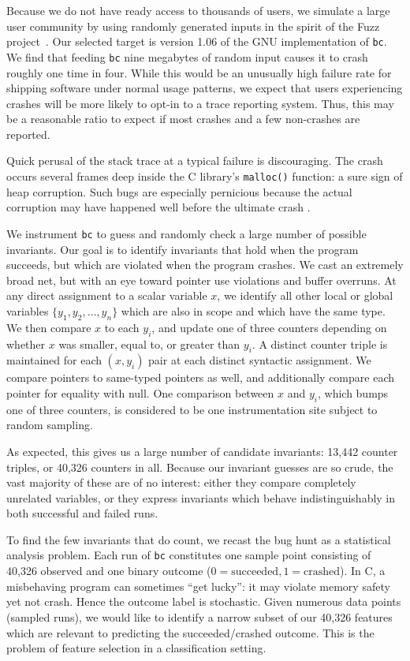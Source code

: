 Because we do not have ready access to thousands of users, we simulate
a large user community by using randomly generated inputs in the
spirit of the Fuzz project~\cite{MKLMMNS95}.  Our selected target is
version 1.06 of the GNU implementation of \texttt{bc}.  We find that
feeding \texttt{bc} nine megabytes of random input causes it to crash
roughly one time in four.  While this would be an unusually high
failure rate for shipping software under normal usage patterns, we
expect that users experiencing crashes will be more likely to opt-in
to a trace reporting system.  Thus, this may be a reasonable ratio to
expect if most crashes and a few non-crashes are reported.

Quick perusal of the stack trace at a typical failure is discouraging.
The crash occurs several frames deep inside the C library's
\texttt{malloc()} function: a sure sign of heap corruption.  Such bugs
are especially pernicious because the actual corruption may have
happened well before the ultimate crash \cite{Eisenstadt1993b}.

We instrument \texttt{bc} to guess and randomly check a large number
of possible invariants.  Our goal is to identify invariants that hold
when the program succeeds, but which are violated when the program
crashes.  We cast an extremely broad net, but with an eye toward
pointer use violations and buffer overruns.  At any direct assignment
to a scalar variable $x$, we identify all other local or global
variables $\{ y_1, y_2, \dots, y_n \}$ which are also in scope and
which have the same type.  We then compare $x$ to each $y_i$, and
update one of three counters depending on whether $x$ was smaller,
equal to, or greater than $y_i$.  A distinct counter triple is
maintained for each $(x, y_i)$ pair at each distinct syntactic
assignment.  We compare pointers to same-typed pointers as well, and
additionally compare each pointer for equality with null.  One
comparison between $x$ and $y_i$, which bumps one of three counters,
is considered to be one instrumentation site subject to random
sampling.

As expected, this gives us a large number of candidate invariants:
13,442 counter triples, or 40,326 counters in all.  Because our
invariant guesses are so crude, the vast majority of these are of no
interest: either they compare completely unrelated variables, or they
express invariants which behave indistinguishably in both successful
and failed runs.

To find the few invariants that do count, we recast the bug hunt as a
statistical analysis problem.  Each run of \texttt{bc} constitutes one
sample point consisting of 40,326 observed  and one
binary outcome ($0 = \text{succeeded}, 1 = \text{crashed}$).  In C, a
misbehaving program can sometimes ``get lucky'': it may violate memory
safety yet not crash.  Hence the outcome label is stochastic.  Given
numerous data points (sampled runs), we would like to identify a
narrow subset of our 40,326 features which are relevant to predicting
the succeeded/crashed outcome.  This is the problem of feature
selection in a classification setting.

